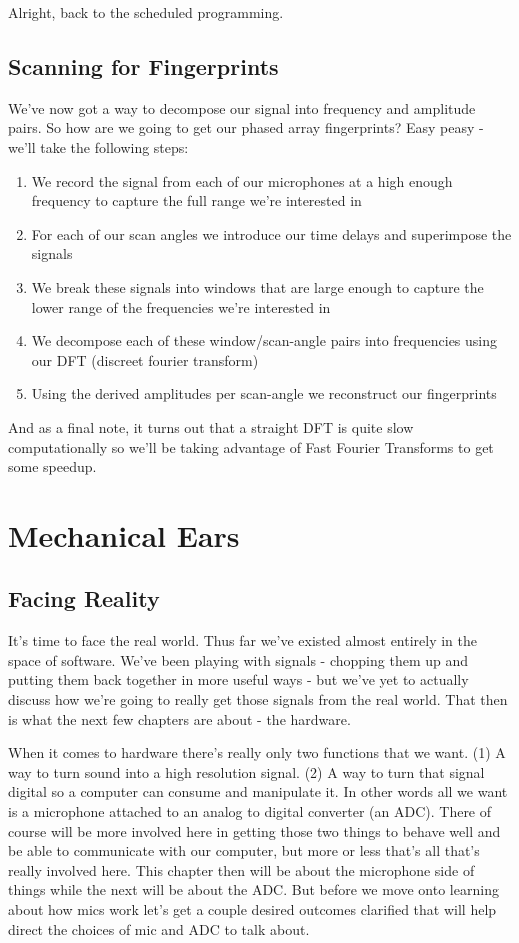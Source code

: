 \documentclass[12pt,a6paper]{book}
\begin{document}
Alright, back to the scheduled programming. 

\section{Scanning for Fingerprints}
We've now got a way to decompose our signal into frequency and amplitude pairs. So how are we going to get our phased array fingerprints? Easy peasy - we'll take the following steps:

\begin{enumerate}
\item We record the signal from each of our microphones at a high enough frequency to capture the full range we're interested in
\item For each of our scan angles we introduce our time delays and superimpose the signals
\item We break these signals into windows that are large enough to capture the lower range of the frequencies we're interested in
\item We decompose each of these window/scan-angle pairs into frequencies using our DFT (discreet fourier transform)
\item Using the derived amplitudes per scan-angle we reconstruct our fingerprints
\end{enumerate}

And as a final note, it turns out that a straight DFT is quite slow computationally so we'll be taking advantage of Fast Fourier Transforms to get some speedup.  

\newpage
\chapter{Mechanical Ears}
\section{Facing Reality}
It's time to face the real world. Thus far we've existed almost entirely in the space of software. We've been playing with signals - chopping them up and putting them back together in more useful ways - but we've yet to actually discuss how we're going to really get those signals from the real world. That then is what the next few chapters are about - the hardware. 

When it comes to hardware there's really only two functions that we want. (1) A way to turn sound into a high resolution signal. (2) A way to turn that signal digital so a computer can consume and manipulate it. In other words all we want is a microphone attached to an analog to digital converter (an ADC). There of course will be more involved here in getting those two things to behave well and be able to communicate with our computer, but more or less that's all that's really involved here. This chapter then will be about the microphone side of things while the next will be about the ADC. But before we move onto learning about how mics work let's get a couple desired outcomes clarified that will help direct the choices of mic and ADC to talk about.  
\end{document}
